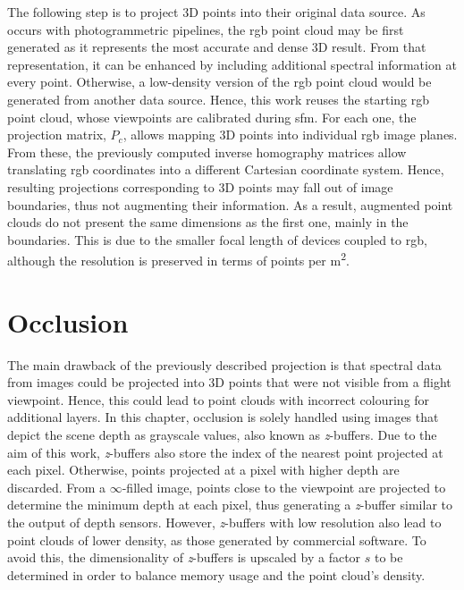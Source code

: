The following step is to project 3D points into their original data source. As occurs with photogrammetric pipelines, the \acrshort{rgb} point cloud may be first generated as it represents the most accurate and dense 3D result. From that representation, it can be enhanced by including additional spectral information at every point. Otherwise, a low-density version of the \acrshort{rgb} point cloud would be generated from another data source. Hence, this work reuses the starting \acrshort{rgb} point cloud, whose viewpoints are calibrated during \acrshort{sfm}. For each one, the projection matrix, $P_c$, allows mapping 3D points into individual \acrshort{rgb} image planes. From these, the previously computed inverse homography matrices allow translating \acrshort{rgb} coordinates into a different Cartesian coordinate system. Hence, resulting projections corresponding to 3D points may fall out of image boundaries, thus not augmenting their information. As a result, augmented point clouds do not present the same dimensions as the first one, mainly in the boundaries. This is due to the smaller focal length of devices coupled to \acrshort{rgb}, although the resolution is preserved in terms of points per \si{\meter\squared}.

\section{Occlusion}

The main drawback of the previously described projection is that spectral data from images could be projected into 3D points that were not visible from a flight viewpoint. Hence, this could lead to point clouds with incorrect colouring for additional layers. In this chapter, occlusion is solely handled using images that depict the scene depth as grayscale values, also known as \textit{z}-buffers. Due to the aim of this work, \textit{z}-buffers also store the index of the nearest point projected at each pixel. Otherwise, points projected at a pixel with higher depth are discarded.  From a $\infty$-filled image, points close to the viewpoint are projected to determine the minimum depth at each pixel, thus generating a \textit{z}-buffer similar to the output of depth sensors. However, \textit{z}-buffers with low resolution also lead to point clouds of lower density, as those generated by commercial software. To avoid this, the dimensionality of \textit{z}-buffers is upscaled by a factor $s$ to be determined in order to balance memory usage and the point cloud's density.

